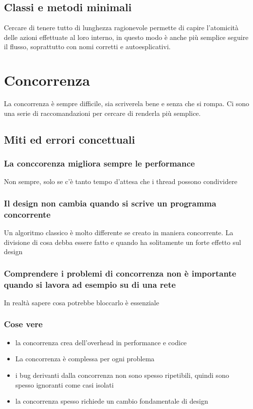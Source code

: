 \documentclass[11pt,a4paper]{book}
\begin{document}
\section{Classi e metodi minimali}
Cercare di tenere tutto di lunghezza ragionevole permette di capire l'atomicità delle azioni effettuate al loro interno, in questo modo è anche più semplice seguire il flusso, soprattutto con nomi corretti e autoesplicativi.

\chapter{Concorrenza}
La concorrenza è sempre difficile, sia scriverela bene e senza che si rompa. Ci sono una serie di raccomandazioni per cercare di renderla più semplice.

\section{Miti ed errori concettuali}
\subsection{La conccorenza migliora sempre le performance}
Non sempre, solo se c'è tanto tempo d'attesa che i thread possono condividere

\subsection{Il design non cambia quando si scrive un programma concorrente}
Un algoritmo classico è molto differente se creato in maniera concorrente. La divisione di cosa debba essere fatto e quando ha solitamente un forte effetto sul design

\subsection{Comprendere i problemi di concorrenza non è importante quando si lavora ad esempio su di una rete}
In realtà sapere cosa potrebbe bloccarlo è essenziale

\subsection{Cose vere}
\begin{itemize}
	\item la concorrenza crea dell'overhead in performance e codice
	\item La concorrenza è complessa per ogni problema
	\item i bug derivanti dalla concorrenza non sono spesso ripetibili, quindi sono spesso ignoranti come casi isolati
	\item la concorrenza spesso richiede un cambio fondamentale di design
\end{itemize}
\end{document}
